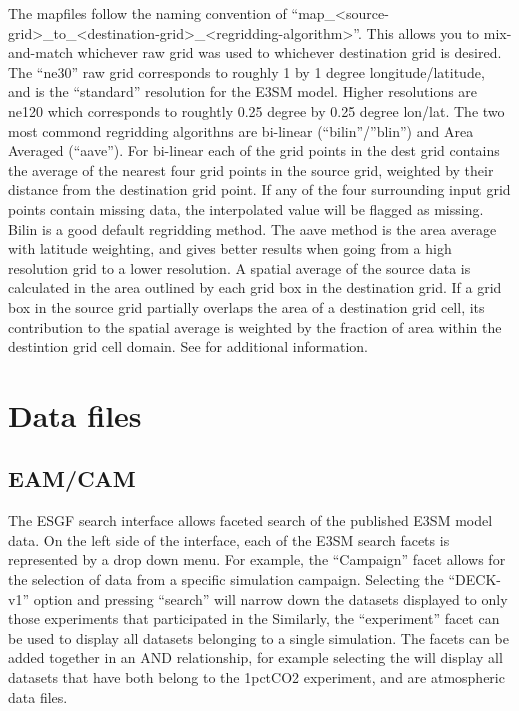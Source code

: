 \documentclass[letterpaper,10pt,english]{sphinxmanual}
\begin{document}
 The mapfiles follow the naming convention of “map\_\textless{}source-grid\textgreater{}\_to\_\textless{}destination-grid\textgreater{}\_\textless{}regridding-algorithm\textgreater{}”. This allows you to mix-and-match
whichever raw grid was used to whichever destination grid is desired. The “ne30” raw grid corresponds to roughly 1 by 1 degree longitude/latitude, and is the “standard” resolution for the E3SM model. Higher
resolutions are ne120 which corresponds to roughtly 0.25 degree by 0.25 degree lon/lat. The two most commond regridding algorithns are bi-linear (“bilin”/”blin”) and Area Averaged (“aave”). For bi-linear each of the grid points in the dest grid contains the
average of the nearest four grid points in the source grid, weighted by their distance from the destination grid point. If any of the four surrounding input grid points contain missing data, the interpolated value will be flagged as missing. Bilin is a good default
regridding method. The aave method is the area average with latitude weighting, and gives better results when going from a high resolution grid to a lower resolution. A spatial average of the source data is calculated in the area outlined by each grid box in the destination grid.
If a grid box in the source grid partially overlaps the area of a destination grid cell, its contribution to the spatial average is weighted by the fraction of area within the destintion grid cell domain. See  for additional information.


\section{Data files}
\label{\detokenize{guide:data-files}}

\subsection{EAM/CAM}
\label{\detokenize{guide:eam-cam}}
 The ESGF search interface allows faceted search of the published E3SM model data.
On the left side of the interface, each of the E3SM search facets is represented by a drop down menu. For example, the “Campaign” facet allows for the selection of data from a specific
simulation campaign. Selecting the “DECK-v1” option and pressing “search” will narrow down the datasets displayed to only those experiments that participated in the 
Similarly, the “experiment” facet can be used to display all datasets belonging to a single simulation. The facets can be added together in an AND relationship, for example selecting the 
will display all datasets that have both belong to the 1pctCO2 experiment, and are atmospheric data files.
\end{document}
